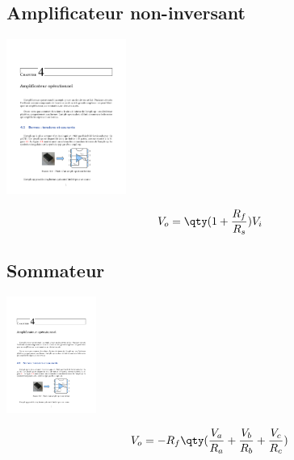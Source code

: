 \subsection{Amplificateur non-inversant}
\begin{multicols*}{2}
\centering
\includegraphics[trim={2.75in 7.625in 2.75in 1.125in}, clip=true,page=6,height=2in]{fig/fig.pdf}

\begin{equation*}
    V_o = \qty(1+\frac{R_f}{R_s})V_i
\end{equation*}
\end{multicols*}


\subsection{Sommateur}
\begin{multicols*}{2}
\centering
\includegraphics[trim={2.5in 6.75in 2.5in 2.25in}, clip=true, page=5, height=1.5in]{fig/fig.pdf}

\begin{equation*}
    V_o = -R_f\qty(\frac{V_a}{R_a}+\frac{V_b}{R_b}+\frac{V_c}{R_c})
\end{equation*}
\end{multicols*}


